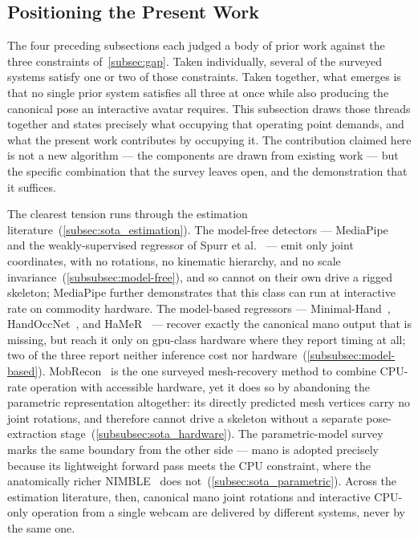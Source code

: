 \subsection{Positioning the Present Work}\label{subsec:sota_positioning}

The four preceding subsections each judged a body of prior work against the
three constraints of~\autoref{subsec:gap}.
Taken individually, several of the surveyed systems satisfy one or two of those
constraints.
Taken together, what emerges is that no single prior system satisfies all three
at once while also producing the canonical pose an interactive avatar requires.
This subsection draws those threads together and states precisely what occupying
that operating point demands, and what the present work contributes by occupying
it.
The contribution claimed here is not a new algorithm --- the components are drawn
from existing work --- but the specific combination that the survey leaves open,
and the demonstration that it suffices.

The clearest tension runs through the estimation
literature~(\autoref{subsec:sota_estimation}).
The model-free detectors --- MediaPipe~\cite{zhang2020mediapipehands} and the
weakly-supervised regressor of Spurr et al.~\cite{spurr2020weakly} --- emit only
joint coordinates, with no rotations, no kinematic hierarchy, and no scale
invariance~(\autoref{subsubsec:model-free}), and so cannot on their own drive a
rigged skeleton; MediaPipe further demonstrates that this class can run at
interactive rate on commodity hardware.
The model-based regressors --- Minimal-Hand~\cite{zhou2020monocular},
HandOccNet~\cite{park2022handoccnet}, and HaMeR~\cite{pavlakos2024hamer} ---
recover exactly the canonical \acrshort{mano} output that is missing, but reach
it only on \acrshort{gpu}-class hardware where they report timing at all; two of
the three report neither inference cost nor
hardware~(\autoref{subsubsec:model-based}).
MobRecon~\cite{chen2022mobrecon} is the one surveyed mesh-recovery method to
combine CPU-rate operation with accessible hardware, yet it does so by
abandoning the parametric representation altogether: its directly predicted mesh
vertices carry no joint rotations, and therefore cannot drive a skeleton without
a separate pose-extraction stage~(\autoref{subsubsec:sota_hardware}).
The parametric-model survey marks the same boundary from the other side ---
\acrshort{mano} is adopted precisely because its lightweight forward pass meets
the CPU constraint, where the anatomically richer NIMBLE~\cite{zhang2022nimble}
does not~(\autoref{subsec:sota_parametric}).
Across the estimation literature, then, canonical \acrshort{mano} joint rotations
and interactive CPU-only operation from a single webcam are delivered by
different systems, never by the same one.

